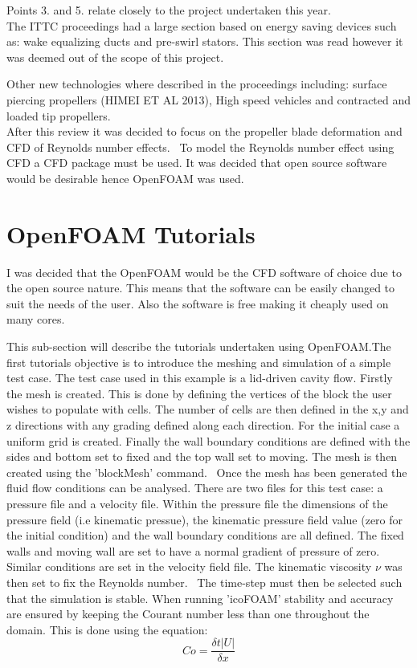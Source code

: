\documentclass[]{report}
\begin{document}
Points 3. and 5. relate closely to the project undertaken this year.
\\

The ITTC proceedings had a large section based on energy saving devices such as: wake equalizing ducts and pre-swirl stators. This section was read however it was deemed out of the scope of this project. 

Other new technologies where described in the proceedings including: surface piercing propellers (HIMEI ET AL 2013), High speed vehicles and contracted and loaded tip propellers. 
\\
After this review it was decided to focus on the propeller blade deformation and CFD of Reynolds number effects.
\
To model the Reynolds number effect using CFD a CFD package must be used. It was decided that open source software would be desirable hence OpenFOAM was used.

\section{OpenFOAM Tutorials}

I was decided that the OpenFOAM would be the CFD software of choice due to the open source nature. This means that the software can be easily changed to suit the needs of the user. Also the software is free making it cheaply used on many cores.

This sub-section will describe the tutorials undertaken using OpenFOAM.The first tutorials objective is to introduce the meshing and simulation of a simple test case. The test case used in this example is a lid-driven cavity flow. 
Firstly the mesh is created. This is done by defining the vertices of the block the user wishes to populate with cells. The number of cells are then defined in the x,y and z directions with any grading defined along each direction. For the initial case a uniform grid is created. Finally the wall boundary conditions are defined with the sides and bottom set to fixed and the top wall set to moving. The mesh is then created using the 'blockMesh' command. 
\
Once the mesh has been generated the fluid flow conditions can be analysed. There are two files for this test case: a pressure file and a velocity file. Within the pressure file the dimensions of the pressure field (i.e kinematic pressue), the kinematic pressure field value (zero for the initial condition) and the wall boundary conditions are all defined. The fixed walls and moving wall are set to have a normal gradient of pressure of zero. Similar conditions are set in the velocity field file. The kinematic viscosity $ \nu$ was then set to fix the Reynolds number.
\ 
The time-step must then be selected such that the simulation is stable. When running 'icoFOAM' stability and accuracy are ensured by keeping the Courant number less than one throughout the domain. This is done using the equation: 
\begin{equation}
Co = \frac{\delta t |U| }{\delta x}
\label{eq:courant}
\end{equation}
\end{document}
